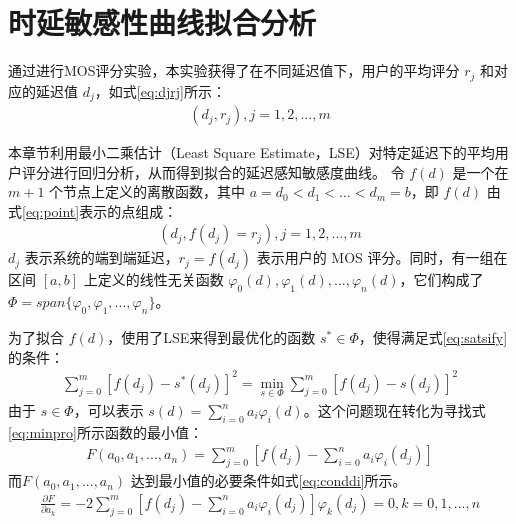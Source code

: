 \section{时延敏感性曲线拟合分析}\label{sec-latency-curve} 
通过进行MOS评分实验，本实验获得了在不同延迟值下，用户的平均评分 $r_j$ 和对应的延迟值 $d_j$，如式\eqref{eq:djrj}所示： 
\begin{equation}
\begin{aligned}
    (d_j, r_j),  j= 1, 2, ..., m
\end{aligned}
\label{eq:djrj}
\end{equation}

本章节利用最小二乘估计（Least Square Estimate，LSE）对特定延迟下的平均用户评分进行回归分析，从而得到拟合的延迟感知敏感度曲线。
令 $f(d)$ 是一个在 $m+1$ 个节点上定义的离散函数，其中 $a = d_0 < d_1 < \dots < d_m = b$，即 $f(d)$ 由式\eqref{eq:point}表示的点组成：
\begin{equation}
\begin{aligned}
    (d_j, f(d_j) = r_j),  j= 1, 2, ..., m
\end{aligned}
\label{eq:point}
\end{equation}
$d_j$ 表示系统的端到端延迟，$r_j = f(d_j)$ 表示用户的 MOS 评分。同时，有一组在区间 $[a,b]$ 上定义的线性无关函数 $\varphi_0(d), \varphi_1(d), ..., \varphi_n(d)$，它们构成了 $\Phi = span\{\varphi_0, \varphi_1, ..., \varphi_n\}$。

为了拟合 $f(d)$，使用了LSE来得到最优化的函数 $s^* \in \Phi$，使得满足式\eqref{eq:satsify}的条件：
\begin{equation}
\begin{aligned}
    \sum^{m}_{j=0}[f(d_j)-s^*(d_j)]^2 = \min_{s \in \Phi} \sum^{m}_{j=0}[f(d_j)-s(d_j)]^2
\end{aligned}
\label{eq:satsify}
\end{equation}
由于 $s \in \Phi$，可以表示 $s(d) = \sum^{n}_{i=0}a_i\varphi_i(d)$。这个问题现在转化为寻找式\eqref{eq:minpro}所示函数的最小值：
\begin{equation}
\begin{aligned}
    F(a_0, a_1, ..., a_n) = \sum^{m}_{j=0}\left[f(d_j)-\sum^{n}_{i=0}a_i\varphi_i(d_j)\right]
\end{aligned}
\label{eq:minpro}
\end{equation}
而$F(a_0, a_1, ..., a_n)$ 达到最小值的必要条件如式\eqref{eq:conddi}所示。
\begin{equation}
\begin{aligned}
    \frac{\partial F}{\partial a_k} = -2\sum^{m}_{j=0}\left[f(d_j)-\sum^{n}_{i=0}a_i\varphi_i(d_j)\right]\varphi_k(d_j)= 0, k = 0, 1, ..., n
\end{aligned}
\label{eq:conddi}
\end{equation}



